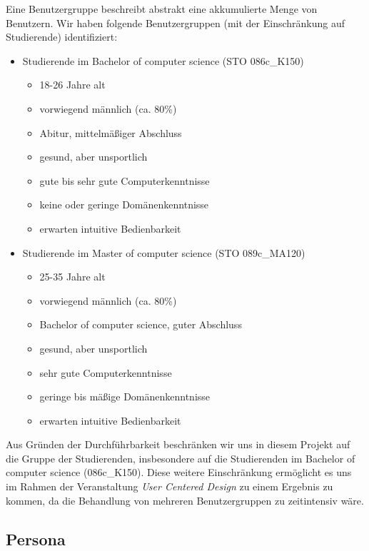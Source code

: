 \documentclass{article}
\begin{document}
Eine Benutzergruppe beschreibt abstrakt eine akkumulierte Menge von Benutzern. Wir haben folgende Benutzergruppen (mit der Einschränkung auf Studierende) identifiziert:
\begin{itemize}
\item Studierende im Bachelor of computer science (STO 086c\_K150)
	\begin{itemize}
	\item 18-26 Jahre alt
	\item vorwiegend männlich (ca. 80\%)
	\item Abitur, mittelmäßiger Abschluss
	\item gesund, aber unsportlich
	\item gute bis sehr gute Computerkenntnisse
	\item keine oder geringe Domänenkenntnisse
	\item erwarten intuitive Bedienbarkeit
	\end{itemize}
	\newpage
\item Studierende im Master of computer science (STO 089c\_MA120)
	\begin{itemize}
	\item 25-35 Jahre alt
	\item vorwiegend männlich (ca. 80\%)
	\item Bachelor of computer science, guter Abschluss
	\item gesund, aber unsportlich
	\item sehr gute Computerkenntnisse
	\item geringe bis mäßige Domänenkenntnisse
	\item erwarten intuitive Bedienbarkeit
	\end{itemize}
\end{itemize}
Aus Gründen der Durchführbarkeit beschränken wir uns in diesem Projekt auf die Gruppe
der Studierenden, insbesondere auf die Studierenden im Bachelor of computer science (086c\_K150). Diese weitere Einschränkung ermöglicht es uns im Rahmen der Veranstaltung \textit{User Centered Design} zu einem Ergebnis zu kommen, da die Behandlung von mehreren Benutzergruppen zu zeitintensiv wäre.

\subsection{Persona}
\end{document}
